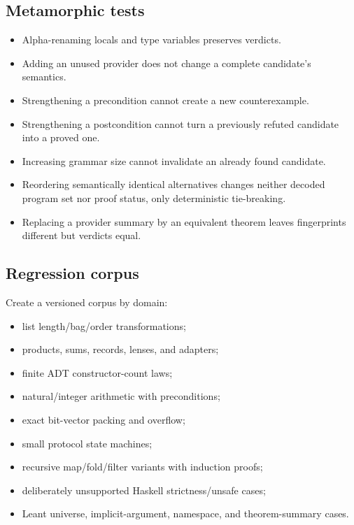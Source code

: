 \documentclass[11pt,oneside]{article}
\begin{document}
\subsection{Metamorphic tests}

\begin{itemize}
  \item Alpha-renaming locals and type variables preserves verdicts.
  \item Adding an unused provider does not change a complete candidate's semantics.
  \item Strengthening a precondition cannot create a new counterexample.
  \item Strengthening a postcondition cannot turn a previously refuted candidate into a
        proved one.
  \item Increasing grammar size cannot invalidate an already found candidate.
  \item Reordering semantically identical alternatives changes neither decoded program
        set nor proof status, only deterministic tie-breaking.
  \item Replacing a provider summary by an equivalent theorem leaves fingerprints
        different but verdicts equal.
\end{itemize}

\subsection{Regression corpus}

Create a versioned corpus by domain:

\begin{itemize}
  \item list length/bag/order transformations;
  \item products, sums, records, lenses, and adapters;
  \item finite ADT constructor-count laws;
  \item natural/integer arithmetic with preconditions;
  \item exact bit-vector packing and overflow;
  \item small protocol state machines;
  \item recursive map/fold/filter variants with induction proofs;
  \item deliberately unsupported Haskell strictness/unsafe cases;
  \item Leant universe, implicit-argument, namespace, and theorem-summary cases.
\end{itemize}
\end{document}
